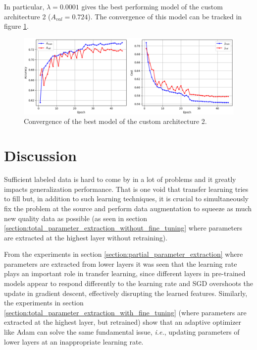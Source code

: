 In particular, $\lambda = 0.0001$ gives the best performing model of the custom architecture 2 ($A_{val} = 0.724$). The convergence of this model can be tracked in figure \ref{fig:custom2_best_training}.

\begin{figure}[ht]
    \centering
    \includegraphics[width=1.0\textwidth]{figs/custom2_best_training.png}
    \caption{Convergence of the best model of the custom architecture 2.}
    \label{fig:custom2_best_training}
\end{figure}

\section{Discussion}

Sufficient labeled data is hard to come by in a lot of problems and it greatly impacts generalization performance. That is one void that transfer learning tries to fill but, in addition to such learning techniques, it is crucial to simultaneously fix the problem at the source and perform data augmentation to squeeze as much new quality data as possible (as seen in section \ref{section:total_parameter_extraction_without_fine_tuning} where parameters are extracted at the highest layer without retraining).

From the experiments in section \ref{section:partial_parameter_extraction} where parameters are extracted from lower layers it was seen that the learning rate plays an important role in transfer learning, since different layers in pre-trained models appear to respond differently to the learning rate and \ac{SGD} overshoots the update in gradient descent, effectively disrupting the learned features. Similarly, the experiments in section \ref{section:total_parameter_extraction_with_fine_tuning} (where parameters are extracted at the highest layer, but retrained) show that an adaptive optimizer like Adam can solve the same fundamental issue, \textit{i.e.}, updating parameters of lower layers at an inappropriate learning rate.

